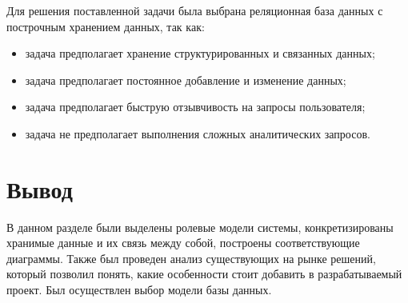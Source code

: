 Для решения поставленной задачи была выбрана реляционная база данных с построчным хранением данных, так как:

\begin{itemize}
    \item задача предполагает хранение структурированных и связанных данных;
    \item задача предполагает постоянное добавление и изменение данных;
    \item задача предполагает быструю отзывчивость на запросы пользователя;
    \item задача не предполагает выполнения сложных аналитических запросов.
\end{itemize}

\section*{Вывод}

В данном разделе были выделены ролевые модели системы, конкретизированы хранимые данные и их связь между собой, построены соответствующие диаграммы. Также был проведен анализ существующих на рынке решений, который позволил понять, какие особенности стоит добавить в разрабатываемый проект. Был осуществлен выбор модели базы данных.